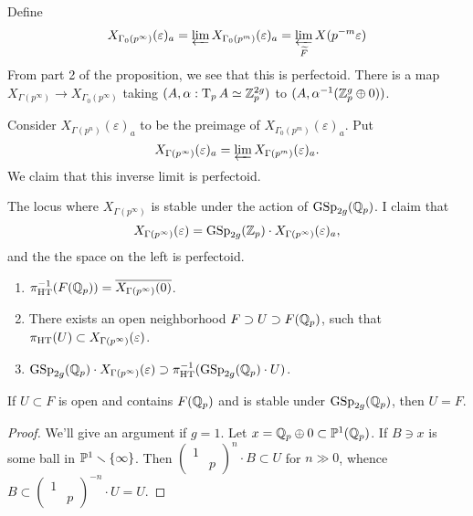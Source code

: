 Define 
\[
  X_{\Gamma_0(p^\infty)}(\varepsilon)_a = \varprojlim X_{\Gamma_0(p^m)}(\varepsilon)_a = \varprojlim_{\widetilde F} X(p^{-m}\varepsilon) 
\]
From part 2 of the proposition, we see that this is perfectoid. There is a map 
$X_{\Gamma(p^\infty)} \to X_{\Gamma_0(p^\infty)}$ taking 
$(A,\alpha:\operatorname T_p A\simeq \mathbb{Z}_p^{2 g})$ to 
$(A,\alpha^{-1}(\mathbb{Z}_p^g\oplus 0))$. 

Consider $X_{\Gamma(p^n)}(\varepsilon)_a$ to be the preimage of 
$X_{\Gamma_0(p^m)}(\varepsilon)_a$. Put 
\[
  X_{\Gamma(p^\infty)}(\varepsilon)_a = \varprojlim X_{\Gamma(p^m)}(\varepsilon)_a .
\]
We claim that this inverse limit is perfectoid. 

The locus where $X_{\Gamma(p^\infty)}$ is stable under the action of 
$\operatorname{GSp}_{2 g}(\mathbb{Q}_p)$. I claim that 
\[
  X_{\Gamma(p^\infty)}(\varepsilon) = \operatorname{GSp}_{2 g}(\mathbb{Z}_p)\cdot X_{\Gamma(p^\infty)}(\varepsilon)_a ,
\]
and the the space on the left is perfectoid. 

\begin{lemma}
\begin{enumerate}
  \item $\pi_\textnormal{HT}^{-1}(F(\mathbb{Q}_p)) = \overline{X_{\Gamma(p^\infty)}(0)}$. 
  \item There exists an open neighborhood $F\supset U\supset F(\mathbb{Q}_p)$, such that 
    $\pi_\textnormal{HT}(U)\subset X_{\Gamma(p^\infty)}(\varepsilon)$. 
  \item $\operatorname{GSp}_{2 g}(\mathbb{Q}_p)\cdot X_{\Gamma(p^\infty)}(\varepsilon)\supset \pi_\textnormal{HT}^{-1}(\operatorname{GSp}_{2 g}(\mathbb{Q}_p)\cdot U)$. 
\end{enumerate}
\end{lemma}

\begin{lemma}
If $U\subset F$ is open and contains $F(\mathbb{Q}_p)$ and is stable under 
$\operatorname{GSp}_{2 g}(\mathbb{Q}_p)$, then $U=F$. 
\end{lemma}
\begin{proof}
We'll give an argument if $g=1$. Let $x=\mathbb{Q}_p\oplus 0\subset \mathbb{P}^1(\mathbb{Q}_p)$. 
If $B\ni x$ is some ball in $\mathbb{P}^1\smallsetminus \{\infty\}$. Then 
$\begin{pmatrix} 1 & \\ & p\end{pmatrix}^n \cdot B\subset U$ for 
$n\gg 0$, whence 
$B\subset \begin{pmatrix} 1 & \\ & p\end{pmatrix}^{-n} \cdot U = U$. 
\end{proof}
